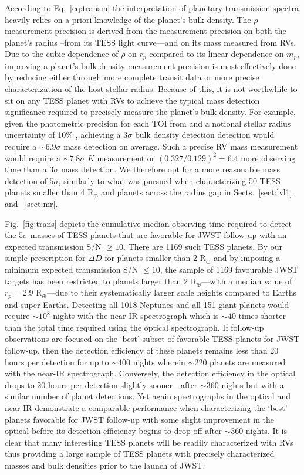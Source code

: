 According to Eq.~\ref{eq:transm} the interpretation of planetary transmission spectra
heavily relies on a-priori knowledge of the planet's bulk density. The $\rho$ measurement
precision is derived from the measurement precision on both the planet's radius \sigrp{-}--from its
TESS light curve---and on its mass measured from RVs. Due to the cubic dependence
of $\rho$ on $r_p$ compared to its linear dependence on $m_p$, improving a planet's bulk density measurement
precision is most effectively done by reducing \sigrp{} either through more complete
transit data or more precise characterization of the host stellar radius. Because of this, it is not
worthwhile to sit on any TESS planet with RVs to achieve the typical mass detection significance required
to precisely measure the planet's bulk density. For example, given the photometric precision for each TOI
from  and a notional stellar radius uncertainty of 10\% \citep{carter08},
achieving a $3\sigma$ bulk
density detection detection would require a $\sim 6.9\sigma$ mass detection on average. Such a precise RV mass
measurement would require a $\sim 7.8\sigma$ $K$ measurement or $(0.327/0.129)^2 = 6.4$ more observing time
than a $3\sigma$ mass detection. We therefore opt for a more reasonable mass detection of $5\sigma$, similarly to
what was pursued when characterizing 50 TESS planets smaller than 4 R$_{\oplus}$ and planets across the radius gap
in Sects.~\ref{sect:lvl1} and ~\ref{sect:mr}.

Fig.~\ref{fig:trans} depicts the cumulative median observing time required to detect the $5\sigma$ masses
of TESS planets that are favorable for JWST follow-up with an expected transmission S/N $\geq 10$.
There are 1169 such TESS planets. By our simple prescription for $\Delta D$ for planets smaller than 2 R$_{\oplus}$
and by imposing a minimum expected transmission S/N $\leq 10$, the sample of 1169 favourable JWST
targets has been restricted to planets larger than 2 R$_{\oplus}$---with a median value
of $r_p = 2.9$ R$_{\oplus}$---due to their systematically larger scale
heights compared to Earths and super-Earths.
Detecting all 1018 Neptunes and all 151 giant planets would require $\sim 10^8$ nights with the near-IR
spectrograph which is $\sim 40$ times
shorter than the total time required using the optical spectrograph.
If follow-up observations are focused on the `best' subset of favorable TESS planets for JWST follow-up,
then the detection efficiency of these planets remains less than 20 hours per detection for up to $\sim 400$
nights wherein $\sim 220$ planets are measured with the near-IR spectrograph. Conversely, the detection
efficiency in the optical drops to 20 hours per detection slightly sooner---after $\sim 360$ nights but with
a similar number of planet detections.
Yet again spectrographs in the optical and near-IR demonstrate a comparable performance
when characterizing the `best' planets favorable for JWST follow-up with some slight improvement in the
optical before its detection efficiency begins to drop off after $\sim 360$ nights. 
It is clear that many interesting TESS planets will be readily
characterized with RVs thus providing a large sample of TESS planets with precisely characterized masses
and bulk densities prior to the launch of JWST.


